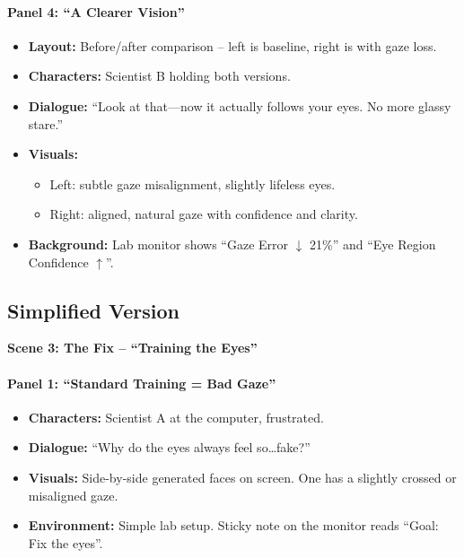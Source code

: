 \paragraph{Panel 4: ``A Clearer Vision''}
\begin{itemize}
    \item \textbf{Layout:} Before/after comparison -- left is baseline, right is with gaze loss.
    \item \textbf{Characters:} Scientist B holding both versions.
    \item \textbf{Dialogue:} ``Look at that---now it actually follows your eyes. No more glassy stare.''
    \item \textbf{Visuals:}
    \begin{itemize}
        \item Left: subtle gaze misalignment, slightly lifeless eyes.
        \item Right: aligned, natural gaze with confidence and clarity.
    \end{itemize}
    \item \textbf{Background:} Lab monitor shows ``Gaze Error $\downarrow$ 21\%'' and ``Eye Region Confidence $\uparrow$''.
\end{itemize}

\subsection{Simplified Version}

\textbf{Scene 3: The Fix -- ``Training the Eyes''}

\paragraph{Panel 1: ``Standard Training = Bad Gaze''}
\begin{itemize}
    \item \textbf{Characters:} Scientist A at the computer, frustrated.
    \item \textbf{Dialogue:} ``Why do the eyes always feel so\ldots fake?''
    \item \textbf{Visuals:} Side-by-side generated faces on screen. One has a slightly crossed or misaligned gaze.
    \item \textbf{Environment:} Simple lab setup. Sticky note on the monitor reads ``Goal: Fix the eyes''.
\end{itemize}

